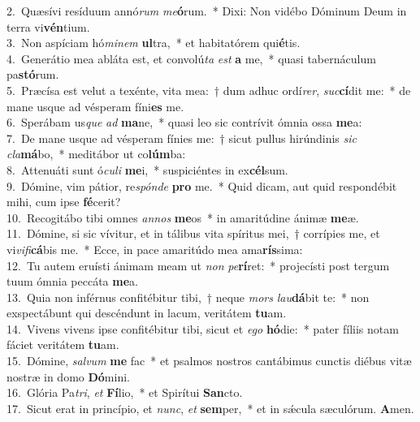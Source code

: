 {2.~}Quæsívi resíduum annó\textit{rum} \textit{me}\textbf{ó}rum.~* Dixi: Non vidébo Dóminum Deum in terra vi\textbf{vén}tium.\\
{3.~}Non aspíciam hó\textit{mi}\textit{nem} \textbf{ul}tra,~* et habitatórem qui\textbf{é}tis.\\
{4.~}Generátio mea abláta est, et convolú\textit{ta} \textit{est} \textbf{a} me,~* quasi tabernáculum pa\textbf{stó}rum.\\
{5.~}Præcísa est velut a texénte, vita mea:~† dum adhuc ordí\textit{rer}, \textit{suc}\textbf{cí}dit me:~* de mane usque ad vésperam fíni\textbf{es} me.\\
{6.~}Sperábam us\textit{que} \textit{ad} \textbf{ma}ne,~* quasi leo sic contrívit ómnia ossa \textbf{me}a:\\
{7.~}De mane usque ad vésperam fínies me:~† sicut pullus hirúndinis \textit{sic} \textit{cla}\textbf{má}bo,~* meditábor ut co\textbf{lúm}ba:\\
{8.~}Attenuáti sunt ó\textit{cu}\textit{li} \textbf{me}i,~* suspiciéntes in ex\textbf{cél}sum.\\
{9.~}Dómine, vim pátior, re\textit{spón}\textit{de} \textbf{pro} me.~* Quid dicam, aut quid respondébit mihi, cum ipse \textbf{fé}cerit?\\
{10.~}Recogitábo tibi omnes \textit{an}\textit{nos} \textbf{me}os~* in amaritúdine ánimæ \textbf{me}æ.\\
{11.~}Dómine, si sic vívitur, et in tálibus vita spíritus mei,~† corrípies me, et vi\textit{vi}\textit{fi}\textbf{cá}bis me.~* Ecce, in pace amaritúdo mea ama\textbf{rís}sima:\\
{12.~}Tu autem eruísti ánimam meam ut \textit{non} \textit{pe}\textbf{rí}ret:~* projecísti post tergum tuum ómnia peccáta \textbf{me}a.\\
{13.~}Quia non inférnus confitébitur tibi,~† neque \textit{mors} \textit{lau}\textbf{dá}bit te:~* non exspectábunt qui descéndunt in lacum, veritátem \textbf{tu}am.\\
{14.~}Vivens vivens ipse confitébitur tibi, sicut et \textit{e}\textit{go} \textbf{hó}die:~* pater fíliis notam fáciet veritátem \textbf{tu}am.\\
{15.~}Dómine, \textit{sal}\textit{vum} \textbf{me} fac~* et psalmos nostros cantábimus cunctis diébus vitæ nostræ in domo \textbf{Dó}mini.\\
{16.~}Glória Pa\textit{tri}, \textit{et} \textbf{Fí}lio,~* et Spirítui \textbf{San}cto.\\
{17.~}Sicut erat in princípio, et \textit{nunc}, \textit{et} \textbf{sem}per,~* et in sǽcula sæculórum. \textbf{A}men.\\
